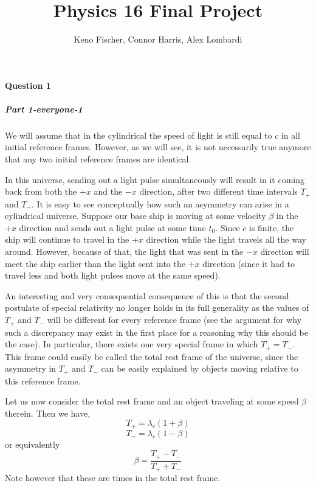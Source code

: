 \title{Physics 16 Final Project}
\newcommand{\f}{\frac} 
\newcommand{\om}{\omega}
\newcommand{\pdif}[2]{\f{\partial #1}{\partial #2}}
\newcommand{\dif}[2]{\f{d#1}{d#2}}
\newcommand{\eqdef}{\equiv}

\author{Keno Fischer, Connor Harris, Alex Lombardi}
\maketitle
\paragraph{Question 1}
\subparagraph*{Part 1-everyone-1}
We will assume that in the cylindrical the speed of light is still equal to $c$ in all initial reference frames. However, as we will see, it is not necessarily true anymore that any two initial reference frames are identical.  \par 
In this universe, sending out a light pulse simultaneously will result in it coming back from both the $+x$ and the $-x$ direction, after two different time intervals $T_+$ and $T_-$. It is easy to see conceptually how such an asymmetry can arise in a cylindrical universe. Suppose our base ship is moving at some velocity $\beta$ in the $+x$ direction and sends out a light pulse at some time $t_0$. Since $c$ is finite, the ship will continue to travel in the $+x$ direction while the light travels all the way around. However, because of that, the light that was sent in the $-x$ direction will meet the ship earlier than the light sent into the $+x$ direction (since it had to travel less and both light pulses move at the same speed). \par 
An interesting and very consequential consequence of this is that the second postulate of special relativity no longer holds in its full generality as the values of $T_+$ and $T_-$ will be different for every reference frame (see the argument for why such a discrepancy may exist in the first place for a reasoning why this should be the case). In particular, there exists one very special frame in which $T_+=T_-$. This frame could easily be called the total rest frame of the universe, since the asymmetry in $T_+$ and $T_-$ can be easily explained by objects moving relative to this reference frame. \par 
Let us now consider the total rest frame and an object traveling at some speed $\beta$ therein. Then we have,
\[ T_+ = \lambda_c(1+\beta) \]
\[ T_- = \lambda_c(1-\beta) \]
or equivalently
\[ \beta = \frac{T_+-T_-}{T_++T_-} \]
Note however that these are times in the total rest frame. 
